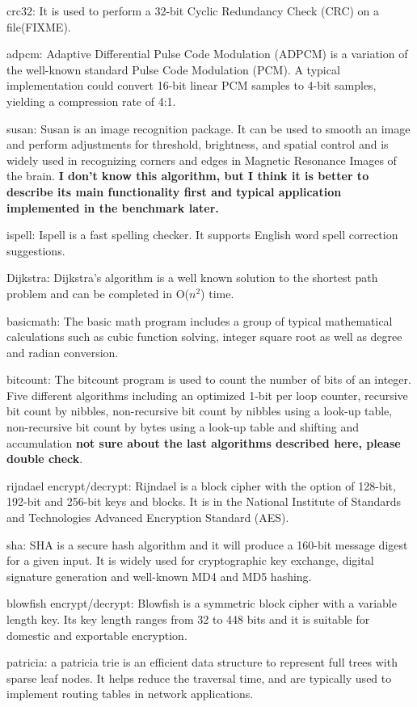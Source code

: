 \documentclass[conference]{IEEEtran}
\begin{document}
crc32: It is used to perform a 32-bit Cyclic Redundancy Check (CRC) on a file(FIXME). 

adpcm: Adaptive Differential Pulse Code Modulation (ADPCM) is a variation of the well-known standard Pulse Code Modulation (PCM). A typical implementation could convert 16-bit linear PCM samples to 4-bit samples, yielding a compression rate of 4:1.

susan: Susan is an image recognition package. It can be used to smooth an image and perform adjustments for threshold, brightness, and spatial control and is widely used in recognizing corners and edges in Magnetic Resonance Images of the brain. \textbf{I don't know this algorithm, but I think it is better to describe its main functionality first and typical application implemented in the benchmark later.}

ispell: Ispell is a fast spelling checker. It supports English word spell correction suggestions.

Dijkstra: Dijkstra's algorithm is a well known solution to the shortest path problem and can be completed in O($n^2$) time.

basicmath: The basic math program includes a group of typical mathematical calculations such as cubic function solving, integer square root as well as degree and radian conversion.

bitcount: The bitcount program is used to count the number of bits of an integer. Five different algorithms including an optimized 1-bit per loop counter, recursive bit count by nibbles, non-recursive bit count by nibbles using a look-up table, non-recursive bit count by bytes using a look-up table and shifting and accumulation \textbf{not sure about the last algorithms described here, please double check}.

rijndael encrypt/decrypt: Rijndael is a block cipher with the option of 128-bit, 192-bit and 256-bit keys and blocks. It is in the National Institute of Standards and Technologies Advanced Encryption Standard (AES). 

sha: SHA is a secure hash algorithm and it will produce a 160-bit message digest for a given input. It is widely used for cryptographic key exchange, digital signature generation and well-known MD4 and MD5 hashing.

blowfish encrypt/decrypt: Blowfish is a symmetric block cipher with a variable length key. Its key length ranges from 32 to 448 bits and it is suitable for domestic and exportable encryption.

patricia: a patricia trie is an efficient data structure to represent full trees with sparse leaf nodes. It helps reduce the traversal time, and are typically used to implement routing tables in network applications. 
\end{document}
